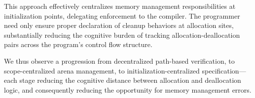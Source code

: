 This approach effectively centralizes memory management responsibilities at initialization points, delegating enforcement to the compiler. The programmer need only ensure proper declaration of cleanup behaviors at allocation sites, substantially reducing the cognitive burden of tracking allocation-deallocation pairs across the program's control flow structure.

We thus observe a progression from decentralized path-based verification, to scope-centralized arena management, to initialization-centralized specification—each stage reducing the cognitive distance between allocation and deallocation logic, and consequently reducing the opportunity for memory management errors.

\newpage

